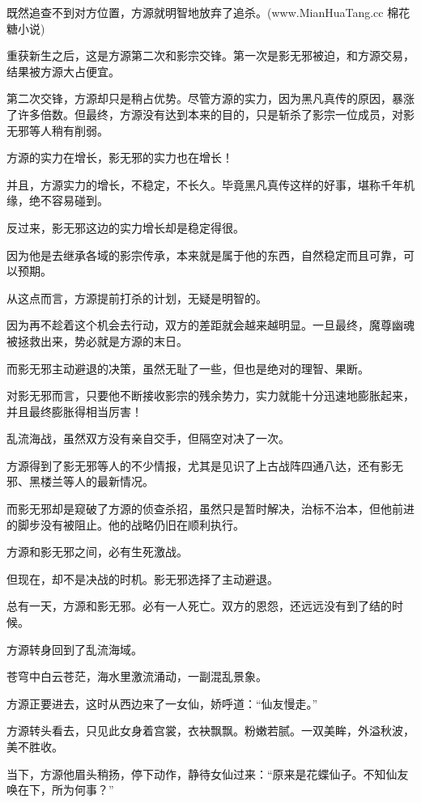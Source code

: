
\begin{this_body}

既然追查不到对方位置，方源就明智地放弃了追杀。(www.MianHuaTang.cc 棉花糖小说)

重获新生之后，这是方源第二次和影宗交锋。第一次是影无邪被迫，和方源交易，结果被方源大占便宜。

第二次交锋，方源却只是稍占优势。尽管方源的实力，因为黑凡真传的原因，暴涨了许多倍数。但最终，方源没有达到本来的目的，只是斩杀了影宗一位成员，对影无邪等人稍有削弱。

方源的实力在增长，影无邪的实力也在增长！

并且，方源实力的增长，不稳定，不长久。毕竟黑凡真传这样的好事，堪称千年机缘，绝不容易碰到。

反过来，影无邪这边的实力增长却是稳定得很。

因为他是去继承各域的影宗传承，本来就是属于他的东西，自然稳定而且可靠，可以预期。

从这点而言，方源提前打杀的计划，无疑是明智的。

因为再不趁着这个机会去行动，双方的差距就会越来越明显。一旦最终，魔尊幽魂被拯救出来，势必就是方源的末日。

而影无邪主动避退的决策，虽然无耻了一些，但也是绝对的理智、果断。

对影无邪而言，只要他不断接收影宗的残余势力，实力就能十分迅速地膨胀起来，并且最终膨胀得相当厉害！

乱流海战，虽然双方没有亲自交手，但隔空对决了一次。

方源得到了影无邪等人的不少情报，尤其是见识了上古战阵四通八达，还有影无邪、黑楼兰等人的最新情况。

而影无邪却是窥破了方源的侦查杀招，虽然只是暂时解决，治标不治本，但他前进的脚步没有被阻止。他的战略仍旧在顺利执行。

方源和影无邪之间，必有生死激战。

但现在，却不是决战的时机。影无邪选择了主动避退。

总有一天，方源和影无邪。必有一人死亡。双方的恩怨，还远远没有到了结的时候。

方源转身回到了乱流海域。

苍穹中白云苍茫，海水里激流涌动，一副混乱景象。

方源正要进去，这时从西边来了一女仙，娇呼道：“仙友慢走。”

方源转头看去，只见此女身着宫裳，衣袂飘飘。粉嫩若腻。一双美眸，外溢秋波，美不胜收。

当下，方源他眉头稍扬，停下动作，静待女仙过来：“原来是花蝶仙子。不知仙友唤在下，所为何事？”


\end{this_body}
